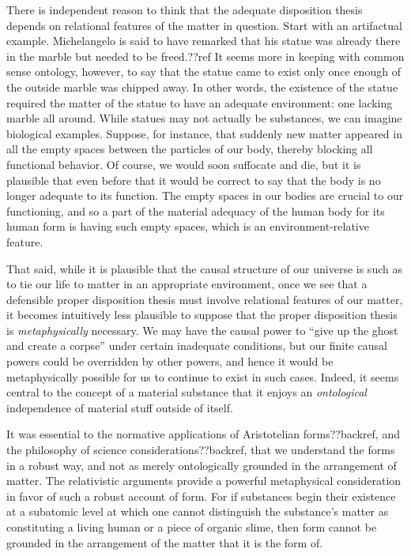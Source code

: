 There is independent reason to think that the adequate disposition thesis depends on relational features of the matter in 
question. Start with an artifactual example. Michelangelo is said to have remarked that his statue was already there in the 
marble but needed to be freed.??ref It seems more in keeping with common sense ontology, however, to say that the statue came 
to exist only once enough of the outside marble was chipped away. In other words, the existence of the statue required the 
matter of the statue to have an adequate environment: one lacking marble all around. While statues may not actually be substances,
we can imagine biological examples. Suppose, for instance, that suddenly new matter appeared in all the empty spaces between the particles of our body, thereby blocking all functional behavior. Of course, we would soon suffocate and die, but it is plausible
that even before that it would be correct to say that the body is no longer adequate to its function. The empty spaces
in our bodies are crucial to our functioning, and so a part of the material adequacy of the human body for its human form 
is having such empty spaces, which is an environment-relative feature.

That said, while it is plausible that the causal structure of our universe is such as to tie our life to matter in an
appropriate environment, once we see that a defensible proper disposition thesis must involve relational features of our matter, it 
becomes intuitively less plausible to suppose that the proper disposition thesis is \textit{metaphysically} necessary. We may have 
the causal power to ``give up the ghost and create a corpse'' under certain inadequate conditions, but 
our finite causal powers could be overridden by other powers, and hence it would be metaphysically possible for us to continue to 
exist in such cases. Indeed, it seems central to the concept of a material substance that it enjoys an \textit{ontological} independence of material stuff outside of itself. 

It was essential to the normative applications of Aristotelian forms??backref, and the philosophy of science
considerations??backref, that we understand
the forms in a robust way, and not as merely ontologically grounded in the arrangement of matter. The relativistic arguments provide a powerful metaphysical consideration in favor of such a robust account of form. For if substances begin their existence
at a subatomic level at which one cannot distinguish the substance's matter as constituting a living human or a piece of organic
slime, then form cannot be grounded in the arrangement of the matter that it is the form of. 

